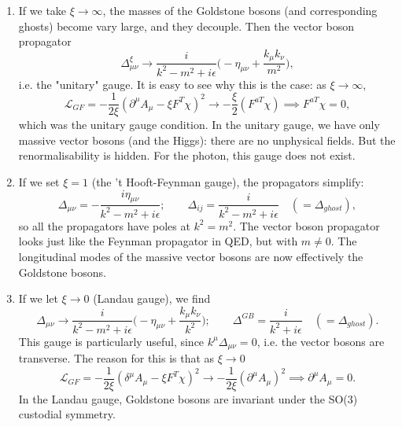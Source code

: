 \begin{enumerate}
\item If we take $\xi \to \infty$, the masses of the Goldstone bosons (and corresponding ghosts) become vary large, and they decouple. Then the vector boson propagator
\begin{equation}
\Delta_{\mu \nu}^\xi \to \frac{i}{k^2 - m^2 + i \epsilon} \bigg(-\eta_{\mu \nu} + \frac{k_\mu k_\nu}{m^2} \bigg),
\end{equation}
i.e. the "unitary" gauge. It is easy to see why this is the case: as $\xi \to \infty$,
\begin{equation}
\mathcal{L}_{GF} = - \frac{1}{2\xi}(\partial^\mu A_\mu - \xi F^T \chi)^2 \to - \frac{\xi}{2}(F^{a T}\chi) \implies F^{aT}\chi = 0,
\end{equation}
which was the unitary gauge condition. In the unitary gauge, we have only massive vector bosons (and the Higgs): there are no unphysical fields. But the renormalisability is hidden. For the photon, this gauge does not exist.
\item If we set $\xi = 1$ (the 't Hooft-Feynman gauge), the propagators simplify:
\begin{equation}
\Delta_{\mu\nu} = - \frac{i\eta_{\mu \nu}}{k^2 - m^2 + i\epsilon}; \qquad \Delta_{ij} = \frac{i}{k^2-m^2 + i\epsilon} \quad (= \Delta_{ghost}),
\end{equation}
so all the propagators have poles at $k^2=m^2$. The vector boson propagator looks just like the Feynman propagator in QED, but with $m \neq 0$. The longitudinal modes of the massive vector bosons are now effectively the Goldstone bosons.
\item If we let $\xi \to 0$ (Landau gauge), we find
\begin{equation}
\Delta_{\mu \nu} \to \frac{i}{k^2 -m^2 + i\epsilon} \bigg(-\eta_{\mu \nu} + \frac{k_\mu k_\nu}{k^2}\bigg); \qquad \Delta^{GB} = \frac{i}{k^2 + i\epsilon} \quad (= \Delta_{ghost}).
\end{equation}
This gauge is particularly useful, since $k^\mu \Delta_{\mu \nu} = 0$, i.e. the vector bosons are transverse. The reason for this is that as $\xi \to 0$
\begin{equation}
\mathcal{L}_{GF} = - \frac{1}{2\xi}(\delta^\mu A_\mu - \xi F^T \chi)^2 \to -\frac{1}{2\xi}(\partial^\mu A_\mu)^2 \implies \partial^\mu A_\mu = 0.
\end{equation}
In the Landau gauge, Goldstone bosons are invariant under the SO(3) custodial symmetry.
\end{enumerate}
%

